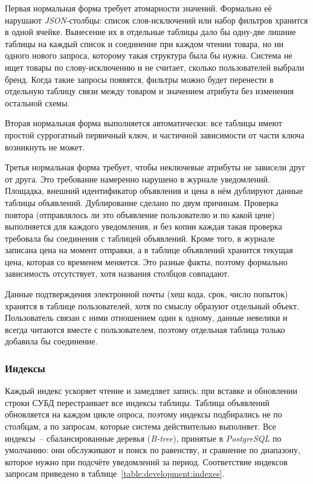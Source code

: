 Первая нормальная форма требует атомарности значений. Формально её нарушают \textit{JSON}-столбцы: список слов-исключений или набор фильтров хранится в одной ячейке. Вынесение их в отдельные таблицы дало бы одну-две лишние таблицы на каждый список и соединение при каждом чтении товара, но ни одного нового запроса, которому такая структура была бы нужна. Система не ищет товары по слову-исключению и не считает, сколько пользователей выбрали бренд. Когда такие запросы появятся, фильтры можно будет перенести в отдельную таблицу связи между товаром и значением атрибута без изменения остальной схемы.

Вторая нормальная форма выполняется автоматически: все таблицы имеют простой суррогатный первичный ключ, и частичной зависимости от части ключа возникнуть не может.

Третья нормальная форма требует, чтобы неключевые атрибуты не зависели друг от друга. Это требование намеренно нарушено в журнале уведомлений. Площадка, внешний идентификатор объявления и цена в нём дублируют данные таблицы объявлений. Дублирование сделано по двум причинам. Проверка повтора (отправлялось ли это объявление пользователю и по какой цене) выполняется для каждого уведомления, и без копии каждая такая проверка требовала бы соединения с таблицей объявлений. Кроме того, в журнале записана цена на момент отправки, а в таблице объявлений хранится текущая цена, которая со временем меняется. Это разные факты, поэтому формально зависимость отсутствует, хотя названия столбцов совпадают.

Данные подтверждения электронной почты (хеш кода, срок, число попыток) хранятся в таблице пользователей, хотя по смыслу образуют отдельный объект. Пользователь связан с ними отношением один к одному, данные невелики и всегда читаются вместе с пользователем, поэтому отдельная таблица только добавила бы соединение.

\subsubsection{Индексы}

Каждый индекс ускоряет чтение и замедляет запись: при вставке и обновлении строки СУБД перестраивает все индексы таблицы. Таблица объявлений обновляется на каждом цикле опроса, поэтому индексы подбирались не по столбцам, а по запросам, которые система действительно выполняет. Все индексы~-- сбалансированные деревья (\textit{B-tree}), принятые в \textit{PostgreSQL} по умолчанию: они обслуживают и поиск по равенству, и сравнение по диапазону, которое нужно при подсчёте уведомлений за период. Соответствие индексов запросам приведено в таблице~\ref{table:development:indexes}.

